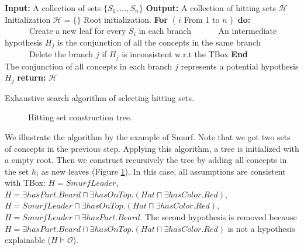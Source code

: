 \documentclass{article}
\begin{document}
\begin{algorithm}[H]
\textbf{Input:} A collection of sets $\{S_1,\dots,S_n\}$\;
\textbf{Output:} A collection of hitting sets $\mathcal{H}$\;
Initialization\:
$\mathcal{H}=\{\}$\;
Root initialization.\;
\textbf{For~}( $i$ From 1 to $n$ )\textbf{~do:}\\
~~~~~~Create a new leaf for every  $S_i$  in each branch\;
~~~~~~An intermediate hypothesis $H_{j}$ is the conjunction of all the concepts in the same branch\;
~~~~~~Delete the branch $j$ if $H_{j}$ is inconsistent w.r.t the TBox\;
\textbf{End}\\
The conjunction of all concepts in each branch $j$ represents a potential hypothesis $H_j$\;
\textbf{return:} $\mathcal{H}$\;
\caption{Exhaustive search algorithm of selecting hitting sets.}\label{exhaustive}
\end{algorithm}


\begin{figure}
\centering
{}
\caption{Hitting set construction tree.\label{fig:hittingtree}}
\end{figure}
We illustrate the algorithm by the example of Smurf. Note that we got two sets of concepts in the previous step.
Applying this algorithm, a tree is initialized with a empty root. Then we construct recursively the tree by adding all concepts
in the set $h_i$ as new leaves (Figure \ref{fig:hittingtree}). In this case, all
assumptions are consistent with TBox:
$H=SmurfLeader$, $H=\exists hasPart.Beard \sqcap \exists hasOnTop.(Hat\sqcap\exists hasColor.Red)$, 
$H=SmurfLeader\sqcap\exists hasOnTop.(Hat\sqcap \exists hasColor.Red)$, $H=SmurfLeader \sqcap \exists hasPart.Beard$. 
The second hypothesis is removed because $H=\exists hasPart.Beard \sqcap \exists hasOnTop.(Hat\sqcap\exists hasColor.Red)$ 
is not a hypothesis explainable ($H\vDash \mathcal{O}$). 
\end{document}
